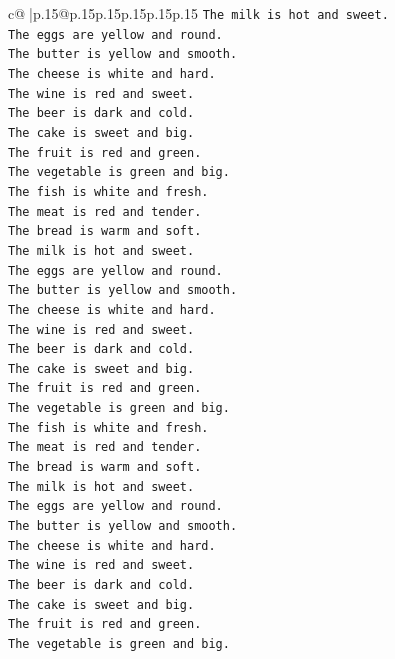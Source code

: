 \documentclass{article}
\begin{document}
{\begin{supertabular}{c@{$\;$}|p{.15\linewidth}@{}p{.15\linewidth}p{.15\linewidth}p{.15\linewidth}p{.15\linewidth}p{.15\linewidth}}
{{{\texttt{The milk is hot and sweet.} \\
\texttt{The eggs are yellow and round.} \\
\texttt{The butter is yellow and smooth.} \\
\texttt{The cheese is white and hard.} \\
\texttt{The wine is red and sweet.} \\
\texttt{The beer is dark and cold.} \\
\texttt{The cake is sweet and big.} \\
\texttt{The fruit is red and green.} \\
\texttt{The vegetable is green and big.} \\
\texttt{The fish is white and fresh.} \\
\texttt{The meat is red and tender.} \\
\texttt{The bread is warm and soft.} \\
\texttt{The milk is hot and sweet.} \\
\texttt{The eggs are yellow and round.} \\
\texttt{The butter is yellow and smooth.} \\
\texttt{The cheese is white and hard.} \\
\texttt{The wine is red and sweet.} \\
\texttt{The beer is dark and cold.} \\
\texttt{The cake is sweet and big.} \\
\texttt{The fruit is red and green.} \\
\texttt{The vegetable is green and big.} \\
\texttt{The fish is white and fresh.} \\
\texttt{The meat is red and tender.} \\
\texttt{The bread is warm and soft.} \\
\texttt{The milk is hot and sweet.} \\
\texttt{The eggs are yellow and round.} \\
\texttt{The butter is yellow and smooth.} \\
\texttt{The cheese is white and hard.} \\
\texttt{The wine is red and sweet.} \\
\texttt{The beer is dark and cold.} \\
\texttt{The cake is sweet and big.} \\
\texttt{The fruit is red and green.} \\
\texttt{The vegetable is green and big.} \\
}}}
\end{supertabular}}
\end{document}
